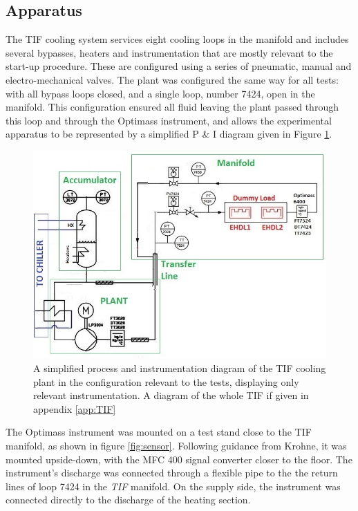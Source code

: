 \documentclass{report}
\begin{document}
\subsection{Apparatus}
The TIF cooling system services eight cooling loops in the manifold and includes several bypasses, heaters and instrumentation that are mostly relevant to the  start-up procedure. These are configured using a series of pneumatic, manual and electro-mechanical valves. 
The plant was configured the same way for all tests: with all bypass loops closed, and a single loop, number 7424, open in the manifold. This configuration ensured all fluid leaving the plant passed through this loop and through the Optimass instrument, and allows the experimental apparatus to be represented by a simplified P \& I diagram given in Figure \ref{fig:TIfsimplified}.\\
\FloatBarrier
\begin{figure}
\includegraphics[width=\textwidth]{TIFsimplified.jpg}
\caption{A simplified process and instrumentation diagram of the TIF cooling plant in the configuration relevant to the tests, displaying only relevant instrumentation. A diagram of the whole TIF if given in appendix \ref{app:TIF}}
\label{fig:TIfsimplified}
\end{figure}
\FloatBarrier
The Optimass instrument was mounted on a test stand close to the TIF manifold, as shown in figure \ref{fig:sensor}. Following guidance from Krohne, it was mounted upside-down, with the MFC 400 signal converter closer to the floor. The instrument's discharge was connected through a flexible pipe to the the return lines of loop 7424 in the \textit{TIF} manifold. On the supply side, the instrument was connected directly to the discharge of the heating section. \\
\end{document}
